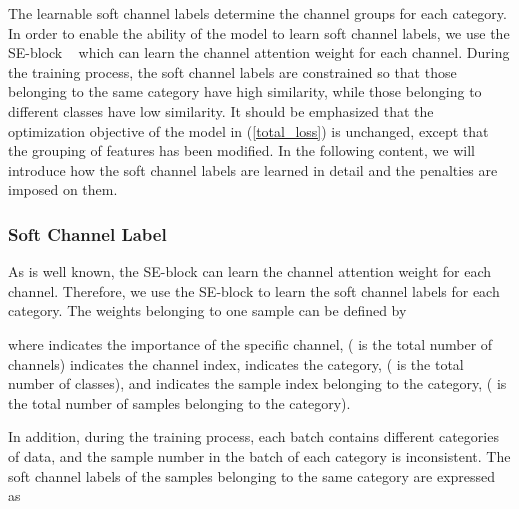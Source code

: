 \documentclass[journal]{IEEEtran}
\begin{document}
The learnable soft channel labels determine the channel groups for each category. In order to enable the ability of the model to learn soft channel labels, we use the SE-block ~\cite{hu2018squeeze} which can learn the channel attention weight for each channel. During the training process, the soft channel labels are constrained so that those belonging to the same category have high similarity, while those belonging to different classes have low similarity. 
It should be emphasized that the optimization objective of the model in (\ref{total_loss}) is unchanged, except that the grouping of features has been modified. In the following content, we will introduce how the soft channel labels are learned in detail and the penalties are imposed on them.






















\subsubsection{Soft Channel Label}\label{channelsoftlabel}


As is well known, the SE-block can learn the channel attention weight for each channel. Therefore, we use the SE-block to learn the soft channel  labels for each category. The weights belonging to one sample can be defined by









\begin{small}

\end{small}



\noindent where  indicates the importance of the specific channel,  ( is the total number of channels) indicates the channel index,  indicates the category,  ( is the total number of classes), and  indicates the sample index belonging to the   category,   ( is the total number of samples belonging to the   category).

In addition, during the training process, each batch  contains different categories of data, and the sample number in the batch of each category is inconsistent. The soft channel labels of the samples belonging to the same category are expressed as
\end{document}
